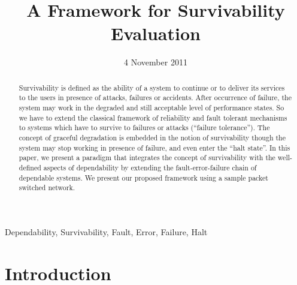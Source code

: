 \documentclass[onecolumn,conference]{IEEEtran}
\begin{document}
    \title{A Framework for Survivability Evaluation}
    \date{4 November 2011}

    \author{
    \and
    }

    \maketitle

    \begin{abstract}
        Survivability is defined as the ability of a system to continue or to deliver its services to the users in presence of attacks, failures or accidents. After occurrence of failure, the system may work in the degraded and still acceptable level of performance states. So we have to extend the classical framework of reliability and fault tolerant mechanisms to systems which have to survive to failures or attacks (``failure tolerance''). The concept of graceful degradation is embedded in the notion of survivability though the system may stop working in presence of failure, and even enter the ``halt state''. In this paper, we present a paradigm that integrates the concept of survivability with the well-defined aspects of dependability by extending the fault-error-failure chain of dependable systems. We present our proposed framework using a sample packet switched network.
    \end{abstract}

    \begin{IEEEkeywords}
        Dependability, Survivability, Fault, Error, Failure, Halt
    \end{IEEEkeywords}

    \section{Introduction} \label{sec:intro}
\end{document}
